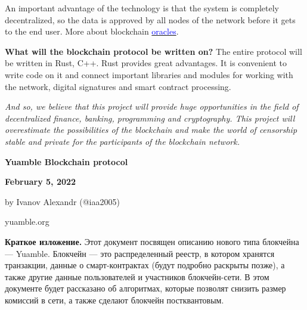 \documentclass[11pt]{article}
\begin{document}
\begin{multicols}{2}
An important advantage of the technology is that the system is completely decentralized, so the data is approved by all nodes of the network before it gets to the end user. More about blockchain \href{https://chain.link/education/blockchain-oracles}{\textcolor{blue}{oracles}}.

\vspace{1\baselineskip}
\textbf{What will the blockchain protocol be written on?} The entire protocol will be written in Rust, C++. Rust provides great advantages. It is convenient to write code on it and connect important libraries and modules for working with the network, digital signatures and smart contract processing.

\vspace{1\baselineskip}
\textit{And so, we believe that this project will provide huge opportunities in the field of decentralized finance, banking, programming and cryptography. This project will overestimate the possibilities of the blockchain and make the world of censorship stable and private for the participants of the blockchain network.}
\end{multicols}





\newpage
\begin{center}
{\Large \textbf{Yuamble Blockchain protocol}}
\end{center}
\vspace{-7mm}

\begin{center}
\textbf{February 5, 2022}
\end{center}
\vspace{-7mm}

\begin{center}
by Ivanov Alexandr (@iaa2005)
\end{center}
\vspace{-7mm}

\begin{center}
yuamble.org
\end{center}

\vspace{1\baselineskip}

\textbf{Краткое изложение.}
Этот документ посвящен описанию нового типа блокчейна — Yuamble. Блокчейн — это распределенный реестр, в котором хранятся транзакции, данные о смарт-контрактах (будут подробно раскрыты позже), а также другие данные пользователей и участников блокчейн-сети. В этом документе будет рассказано об алгоритмах, которые позволят снизить размер комиссий в сети, а также сделают блокчейн постквантовым.
\end{document}
